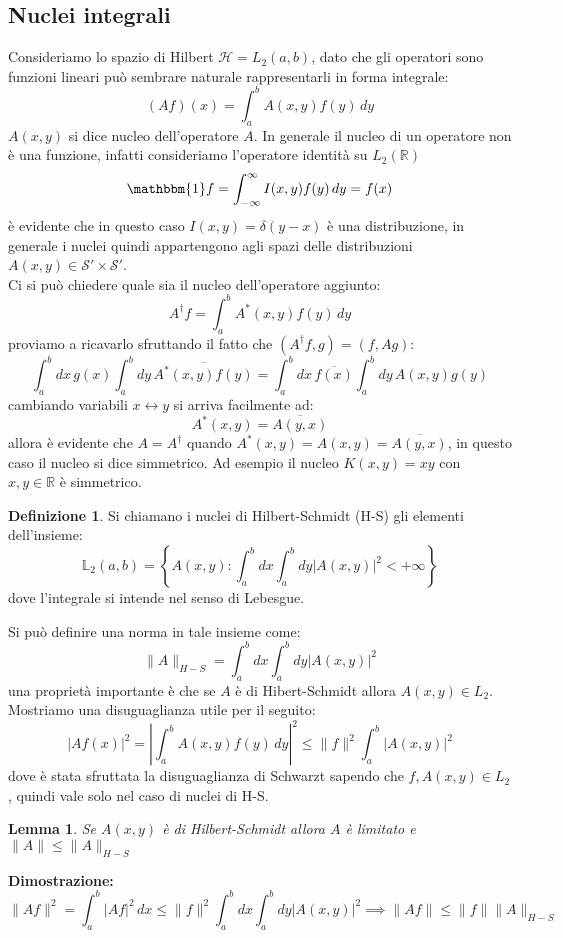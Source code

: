 \documentclass[12pt]{book}
\theoremstyle{plain}
\newcommand{\R}{\mathbb{R}}
\renewcommand{\H}{\mathcal{H}}
\newtheorem{lem}[thm]{Lemma}
\theoremstyle{definition}
\newtheorem{dfn}[thm]{Definizione}
\theoremstyle{remark}
\begin{document}
\subsection{Nuclei integrali}
Consideriamo lo spazio di Hilbert $\H = L_2(a,b)$, dato che gli operatori sono funzioni lineari può sembrare naturale rappresentarli in forma integrale:
\[(Af)(x) = \int_a^b A(x,y)f(y)\,dy\]
$A(x,y)$ si dice nucleo dell'operatore $A$. In generale il nucleo di un operatore non è una funzione, infatti consideriamo l'operatore identità su $L_2(\R)$
\[\mathbbm{1}f = \int_{-\infty}^{\infty} I(x,y)f(y)\,dy = f(x)\]
è evidente che in questo caso $I(x,y) = \delta(y-x)$ è una distribuzione, in generale i nuclei quindi appartengono agli spazi delle distribuzioni $A(x,y) \in \mathcal{S}'\times \mathcal{S}'$. \\
Ci si può chiedere quale sia il nucleo dell'operatore aggiunto:
\[A^\dagger f = \int_a^bA^*(x,y)f(y)\,dy\]
proviamo a ricavarlo sfruttando il fatto che $(A^\dagger f,g) = (f,Ag)$:
\[\int_a^b dx\, g(x)\int_a^bdy\,\overline{A^*(x,y)f(y)} = \int_a^bdx\, \overline{f(x)}\int_a^bdy\, A(x,y)g(y) \]
cambiando variabili $x\leftrightarrow y$ si arriva facilmente ad:
\[A^*(x,y) = \overline{A(y,x)}\]
allora è evidente che $A= A^\dagger$ quando $A^*(x,y) = A(x,y) = \overline{A(y,x)}$, in questo caso il nucleo si dice simmetrico. Ad esempio il nucleo $K(x,y) = xy$ con $x,y\in\R$ è simmetrico.
\begin{dfn}
Si chiamano i nuclei di Hilbert-Schmidt (H-S) gli elementi dell'insieme:
\[\mathbb{L}_2(a,b) = \left\{A(x,y) : \int_a^bdx\int_a^bdy|A(x,y)|^2<+\infty\right\}\]
dove l'integrale si intende nel senso di Lebesgue.
\end{dfn}
Si può definire una norma in tale insieme come:
\[\|A\|_{H-S} =  \int_a^bdx\int_a^bdy|A(x,y)|^2\]
una proprietà importante è che se $A$ è di Hibert-Schmidt allora $A(x,y)\in L_2$.
\\Mostriamo una disuguaglianza utile per il seguito:
\[|Af(x)|^2 = \left|\int_a^b A(x,y)f(y)\,dy\right|^2 \leq \|f\|^2 \int_a^b |A(x,y)|^2\]
dove è stata sfruttata la disuguaglianza di Schwarzt sapendo che $f,A(x,y)\in L_2$, quindi vale solo nel caso di nuclei di H-S.
\begin{lem}
Se $A(x,y)$ è di Hilbert-Schmidt allora $A$ è limitato e $\|A\| \leq \|A\|_{H-S}$
\end{lem}
\hspace{-1.6em}\textbf{Dimostrazione:}
\[\|Af\|^2  =\int_a^b|Af|^2\,dx \leq \|f\|^2 \int_a^bdx\int_a^bdy|A(x,y)|^2 \implies \|Af\| \leq \|f\|\|A\|_{H-S} \]
\end{document}
